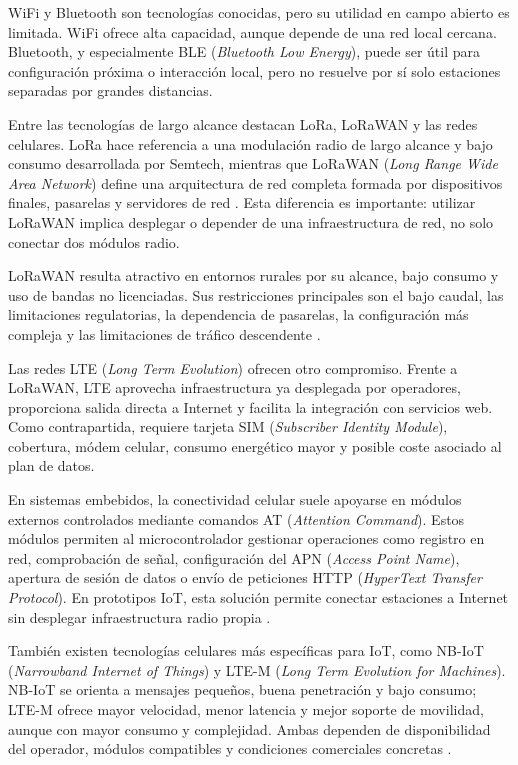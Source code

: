 WiFi y Bluetooth son tecnologías conocidas, pero su utilidad en campo abierto es limitada. WiFi ofrece alta capacidad, aunque depende de una red local cercana. Bluetooth, y especialmente BLE (\textit{Bluetooth Low Energy}), puede ser útil para configuración próxima o interacción local, pero no resuelve por sí solo estaciones separadas por grandes distancias.

Entre las tecnologías de largo alcance destacan LoRa, LoRaWAN y las redes celulares. LoRa hace referencia a una modulación radio de largo alcance y bajo consumo desarrollada por Semtech, mientras que LoRaWAN (\textit{Long Range Wide Area Network}) define una arquitectura de red completa formada por dispositivos finales, pasarelas y servidores de red \cite{semtech2015lora_modulation,augustin2016lora,lora_alliance_104}. Esta diferencia es importante: utilizar LoRaWAN implica desplegar o depender de una infraestructura de red, no solo conectar dos módulos radio.

LoRaWAN resulta atractivo en entornos rurales por su alcance, bajo consumo y uso de bandas no licenciadas. Sus restricciones principales son el bajo caudal, las limitaciones regulatorias, la dependencia de pasarelas, la configuración más compleja y las limitaciones de tráfico descendente \cite{adelantado2017limits}.

Las redes LTE (\textit{Long Term Evolution}) ofrecen otro compromiso. Frente a LoRaWAN, LTE aprovecha infraestructura ya desplegada por operadores, proporciona salida directa a Internet y facilita la integración con servicios web. Como contrapartida, requiere tarjeta SIM (\textit{Subscriber Identity Module}), cobertura, módem celular, consumo energético mayor y posible coste asociado al plan de datos.

En sistemas embebidos, la conectividad celular suele apoyarse en módulos externos controlados mediante comandos AT (\textit{Attention Command}). Estos módulos permiten al microcontrolador gestionar operaciones como registro en red, comprobación de señal, configuración del APN (\textit{Access Point Name}), apertura de sesión de datos o envío de peticiones HTTP (\textit{HyperText Transfer Protocol}). En prototipos IoT, esta solución permite conectar estaciones a Internet sin desplegar infraestructura radio propia \cite{simcom_a7670e_product,simcom_a76xx_at_manual}.

También existen tecnologías celulares más específicas para IoT, como NB-IoT (\textit{Narrowband Internet of Things}) y LTE-M (\textit{Long Term Evolution for Machines}). NB-IoT se orienta a mensajes pequeños, buena penetración y bajo consumo; LTE-M ofrece mayor velocidad, menor latencia y mejor soporte de movilidad, aunque con mayor consumo y complejidad. Ambas dependen de disponibilidad del operador, módulos compatibles y condiciones comerciales concretas \cite{raza2017lpwan}.

